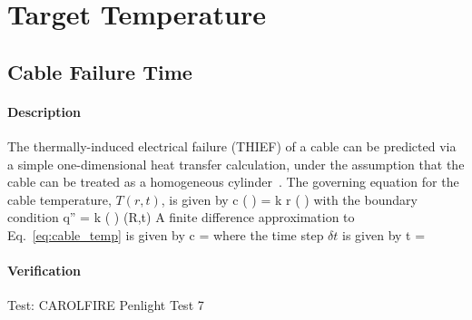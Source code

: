 
\chapter{Target Temperature}
\label{Target_Temperature_Chapter}

\clearpage

\section{Cable Failure Time}

\subsubsection*{Description}

The thermally-induced electrical failure (THIEF) of a cable can be predicted via a simple
one-dimensional heat transfer calculation, under the assumption that the cable can be
treated as a homogeneous cylinder~\cite{CAROLFIRE}. The governing equation for the cable temperature,
$T(r,t)$, is given by
\be
\rho c \left(  \right) =   k r \left(  \right)
\label{eq:cable_temp}
\ee
with the boundary condition
\be
\dot q'' = k \left(  \right) (R,t)
\ee
A finite difference approximation to Eq.~\ref{eq:cable_temp} is given by
\be
\rho c  =   
\ee
where the time step $\delta t$ is given by
\be
\delta t = 
\ee

\subsubsection*{Verification}

Test: CAROLFIRE Penlight Test 7

